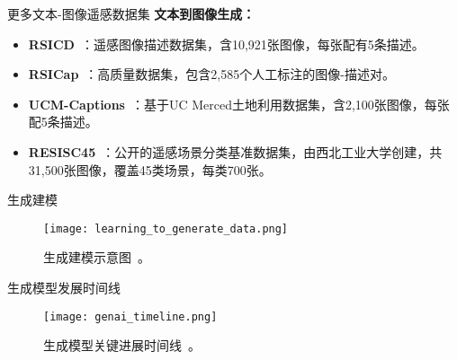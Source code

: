   \begin{refsection}
    \begin{frame}{更多文本-图像遥感数据集}
      \textbf{文本到图像生成：}
      \begin{itemize}
        \item \textbf{RSICD}~\parencite{lu2017exploring}：遥感图像描述数据集，含10,921张图像，每张配有5条描述。
        \item \textbf{RSICap}~\parencite{hu2023rsgpt}：高质量数据集，包含2,585个人工标注的图像-描述对。
        \item \textbf{UCM-Captions}~\parencite{qu2016deep}：基于UC Merced土地利用数据集，含2,100张图像，每张配5条描述。
        \item \textbf{RESISC45}~\parencite{Cheng2017}：公开的遥感场景分类基准数据集，由西北工业大学创建，共31,500张图像，覆盖45类场景，每类700张。
      \end{itemize}
      \bottomleftrefs
    \end{frame}
  \end{refsection}

\begin{refsection}
  \begin{frame}{生成建模}
    \begin{figure}
      \centering
      \texttt{[image: learning\_to\_generate\_data.png]}
      \caption{\scriptsize 生成建模示意图~\parencite{CVPR2023Tutorial}。}
    \end{figure}
    \bottomleftrefs
  \end{frame}
  \end{refsection}
  
  \begin{refsection}
  \begin{frame}{生成模型发展时间线}
    \begin{figure}
      \centering
      \texttt{[image: genai\_timeline.png]}
      \caption{\scriptsize 生成模型关键进展时间线~\parencite{dengPPTAdvancedNueralNetwork2024}。}
    \end{figure}
    \bottomleftrefs
  \end{frame}
  \end{refsection}
  
  
  
